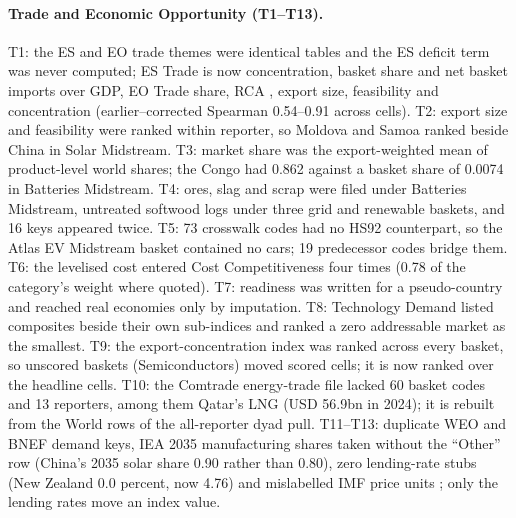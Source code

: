 \paragraph{Trade and Economic Opportunity (T1--T13).} T1: the ES and EO trade themes were identical
tables and the ES deficit term was never computed; ES Trade is now concentration, basket share and
net basket imports over GDP, EO Trade share, RCA \citep{balassa1965trade}, export size, feasibility
and concentration (earlier--corrected Spearman 0.54--0.91 across cells). T2: export size and
feasibility were ranked within reporter, so Moldova and Samoa ranked beside China in Solar
Midstream. T3: market share was the export-weighted mean of product-level world shares; the Congo
had 0.862 against a basket share of 0.0074 in Batteries Midstream. T4: ores, slag and scrap were
filed under Batteries Midstream, untreated softwood logs under three grid and renewable baskets, and
16 keys appeared twice. T5: 73 crosswalk codes had no HS92 counterpart, so the Atlas EV Midstream
basket contained no cars; 19 predecessor codes bridge them. T6: the levelised cost entered Cost
Competitiveness four times (0.78 of the category's weight where quoted). T7: readiness was written for
a pseudo-country and reached real economies only by imputation. T8: Technology Demand listed
composites beside their own sub-indices and ranked a zero addressable market as the smallest. T9: the
export-concentration index was ranked across every basket, so unscored baskets (Semiconductors)
moved scored cells; it is now ranked over the headline cells. T10: the Comtrade energy-trade file
lacked 60 basket codes and 13 reporters, among them Qatar's LNG (USD 56.9bn in 2024); it is rebuilt
from the World rows of the all-reporter dyad pull. T11--T13: duplicate WEO and BNEF demand keys,
IEA 2035 manufacturing shares taken without the ``Other'' row (China's 2035 solar share 0.90 rather
than 0.80), zero lending-rate stubs (New Zealand 0.0 percent, now 4.76) and mislabelled IMF price
units \citep{imf2026pcps}; only the lending rates move an index value.

